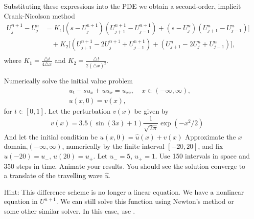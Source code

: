 Substituting these expressions into the PDE we obtain a second-order, implicit Crank-Nicolson method
\begin{align*}
U_j^{n+1} - U_j^n &= K_1 \big[(s - U_j^{n+1})(U_{j+1}^{n+1} - U_{j-1}^{n+1})
+ (s - U_j^n) (U_{j+1}^n - U_{j-1}^n) \big] \\
&{ }  \quad
+ K_2 \big[(U_{j+1}^{n+1} - 2U_j^{n+1}+ U_{j-1}^{n+1}) + (U_{j+1}^n -2U_j^n + U_{j-1}^n) \big],\\
&{ }  \quad
\end{align*}
where $K_1 = \frac{ \triangle t }{4 \triangle x}$ and $K_2 = \frac{ \triangle t}{2(\triangle x)^2}$.

\begin{problem}
Numerically solve the initial value problem
\begin{align*}
	&{ } u_t -su_x + uu_x = u_{xx}, \quad x \in (-\infty,\infty),\\
	&{ } u(x,0) = v(x),
\end{align*}
for $t \in [0,1]$.
Let the perturbation $v(x)$ be given by
\[v(x) = 3.5(\sin{(3x)} + 1)\frac{1}{\sqrt{2\pi}} \exp{(-x^2/2)}\]
And let the initial condition be $u(x, 0) = \hat{u}(x) + v(x)$
Approximate the $x$ domain,$(-\infty, \infty)$, numerically by the finite interval $[-20,20]$, and fix $u(-20) = u_-$, $u(20) = u_+$. Let $u_- = 5$, $u_+ = 1$.
Use 150 intervals in space and 350 steps in time.
Animate your results.
You should see the solution converge to a translate of the travelling wave $\hat{u}$.

Hint: This difference scheme is no longer a linear equation.
We have a nonlinear equation in $U^{n+1}$.
We can still solve this function using Newton's method or some other similar solver.
In this case, use .
\end{problem} 